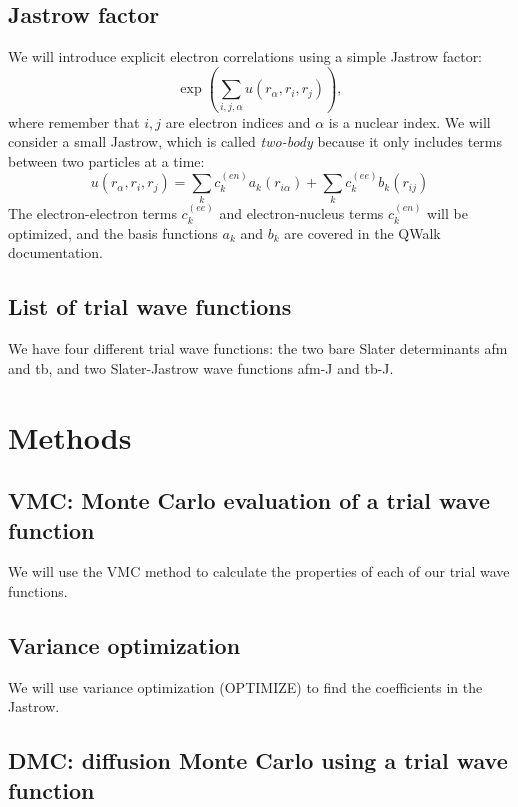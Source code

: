 \documentclass[12pt]{article}
\begin{document}
\subsection*{Jastrow factor}

We will introduce explicit electron correlations using a simple Jastrow factor:
\begin{equation}
\exp\left(\sum_{i,j,\alpha} u(r_\alpha,r_i,r_j) \right),	
\end{equation}
where remember that $i,j$ are electron indices and $\alpha$ is a nuclear index.
We will consider a small Jastrow, which is called {\it two-body} because it only includes terms between two particles at a time:
\begin{equation}
u(r_\alpha,r_i,r_j)=\sum_k c_k^{(en)} a_k(r_{i\alpha}) + \sum_k c_k^{(ee)} b_k(r_{ij})	
\end{equation}
The electron-electron terms $c_k^{(ee)}$ and electron-nucleus terms $c_k^{(en)}$ will be optimized, and the basis functions $a_k$ and $b_k$ are covered in the QWalk documentation.

\subsection*{List of trial wave functions}

We have four different trial wave functions: the two bare Slater determinants afm and tb, and two Slater-Jastrow wave functions afm-J and tb-J.

\section*{Methods}

\subsection*{VMC: Monte Carlo evaluation of a trial wave function}

We will use the VMC method to calculate the properties of each of our trial wave functions.

\subsection*{Variance optimization}

We will use variance optimization (OPTIMIZE) to find the coefficients in the Jastrow.

\subsection*{DMC: diffusion Monte Carlo using a trial wave function}
\end{document}
